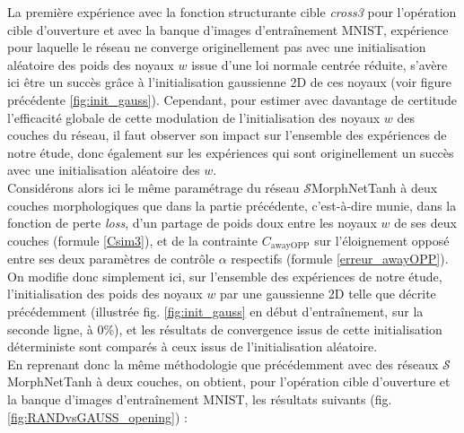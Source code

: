 La première expérience avec la fonction structurante cible \textit{cross3} pour l'opération cible d'ouverture et avec la banque d'images d'entraînement MNIST, expérience pour laquelle le réseau ne converge originellement pas avec une initialisation aléatoire des poids des noyaux $w$ issue d'une loi normale centrée réduite, s'avère ici être un succès grâce à l'initialisation gaussienne 2D de ces noyaux (voir figure précédente \ref{fig:init_gauss}). 
Cependant, pour estimer avec davantage de certitude l'efficacité globale de cette modulation de l'initialisation des noyaux $w$ des couches du réseau, il faut observer son impact sur l'ensemble des expériences de notre étude, donc également sur les expériences qui sont originellement un succès avec une initialisation aléatoire des $w$. \\

\vspace{-1.0mm}
\noindent Considérons alors ici le même paramétrage du réseau $\mathcal{S}$MorphNetTanh à deux couches morphologiques que dans la partie précédente, c'est-à-dire munie, dans la fonction de perte \textit{loss}, d'un partage de poids doux entre les noyaux $w$ de ses deux couches (formule \ref{Csim3}), et de la contrainte $C_\text{awayOPP}$ sur l'éloignement opposé entre ses deux paramètres de contrôle $\alpha$ respectifs (formule \ref{erreur_awayOPP}). On modifie donc simplement ici, sur l'ensemble des expériences de notre étude, l'initialisation des poids des noyaux $w$ par une gaussienne 2D telle que décrite précédemment (illustrée fig. \ref{fig:init_gauss} en début d'entraînement, sur la seconde ligne, à 0\%), et les résultats de convergence issus de cette initialisation déterministe sont comparés à ceux issus de l'initialisation aléatoire. \\

\vspace{-1.0mm}
En reprenant donc la même méthodologie que précédemment avec des réseaux $\mathcal{S}$MorphNetTanh à deux couches, on obtient, pour l’opération cible d’ouverture et la banque d’images d’entraînement MNIST, les résultats suivants (fig. \ref{fig:RANDvsGAUSS_opening}) : \\


